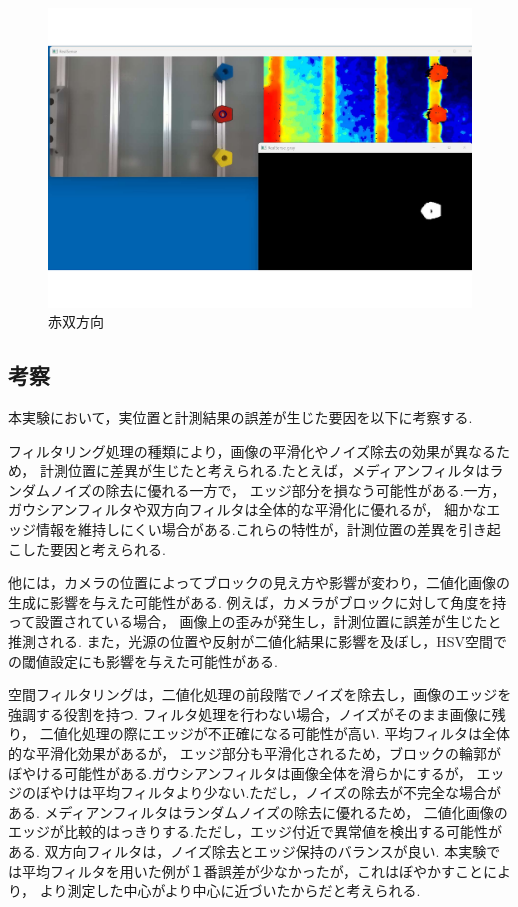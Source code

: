 \begin{figure}[H]
  \centering
  \includegraphics[scale=0.5]{sozai/e.pdf}
  \caption{赤双方向}
\end{figure}



\subsection{考察}
本実験において，実位置と計測結果の誤差が生じた要因を以下に考察する.

フィルタリング処理の種類により，画像の平滑化やノイズ除去の効果が異なるため，
計測位置に差異が生じたと考えられる.たとえば，メディアンフィルタはランダムノイズの除去に優れる一方で，
エッジ部分を損なう可能性がある.一方，ガウシアンフィルタや双方向フィルタは全体的な平滑化に優れるが，
細かなエッジ情報を維持しにくい場合がある.これらの特性が，計測位置の差異を引き起こした要因と考えられる.

他には，カメラの位置によってブロックの見え方や影響が変わり，二値化画像の生成に影響を与えた可能性がある.
例えば，カメラがブロックに対して角度を持って設置されている場合，
画像上の歪みが発生し，計測位置に誤差が生じたと推測される.
また，光源の位置や反射が二値化結果に影響を及ぼし，HSV空間での閾値設定にも影響を与えた可能性がある.

空間フィルタリングは，二値化処理の前段階でノイズを除去し，画像のエッジを強調する役割を持つ.
フィルタ処理を行わない場合，ノイズがそのまま画像に残り，
二値化処理の際にエッジが不正確になる可能性が高い. 平均フィルタは全体的な平滑化効果があるが，
エッジ部分も平滑化されるため，ブロックの輪郭がぼやける可能性がある.ガウシアンフィルタは画像全体を滑らかにするが，
エッジのぼやけは平均フィルタより少ない.ただし，ノイズの除去が不完全な場合がある.
メディアンフィルタはランダムノイズの除去に優れるため，
二値化画像のエッジが比較的はっきりする.ただし，エッジ付近で異常値を検出する可能性がある.
双方向フィルタは，ノイズ除去とエッジ保持のバランスが良い.
本実験では平均フィルタを用いた例が１番誤差が少なかったが，これはぼやかすことにより，
より測定した中心がより中心に近づいたからだと考えられる.


